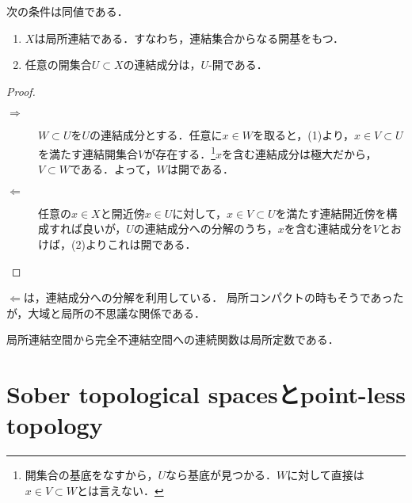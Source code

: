 \documentclass[uplatex,dvipdfmx]{jsreport}
\begin{document}
\begin{proposition}
    次の条件は同値である．
    \begin{enumerate}
        \item $X$は局所連結である．すなわち，連結集合からなる開基をもつ．
        \item 任意の開集合$U\subset X$の連結成分は，$U$-開である．
    \end{enumerate}
\end{proposition}
\begin{proof}\mbox{}
    \begin{description}
        \item[$\Rightarrow$] $W\subset U$を$U$の連結成分とする．任意に$x\in W$を取ると，(1)より，$x\in V\subset U$を満たす連結開集合$V$が存在する．\footnote{開集合の基底をなすから，$U$なら基底が見つかる．$W$に対して直接は$x\in V\subset W$とは言えない．}$x$を含む連結成分は極大だから，$V\subset W$である．よって，$W$は開である．
        \item[$\Leftarrow$] 任意の$x\in X$と開近傍$x\in U$に対して，$x\in V\subset U$を満たす連結開近傍を構成すれば良いが，$U$の連結成分への分解のうち，$x$を含む連結成分を$V$とおけば，(2)よりこれは開である．
    \end{description}
\end{proof}
\begin{remarks}
    $\Leftarrow$は，連結成分への分解を利用している．
    局所コンパクトの時もそうであったが，大域と局所の不思議な関係である．
\end{remarks}

\begin{corollary}
    局所連結空間から完全不連結空間への連続関数は局所定数である．
\end{corollary}

\section{Sober topological spacesとpoint-less topology}\label{sec-sober-spaces}
\end{document}
